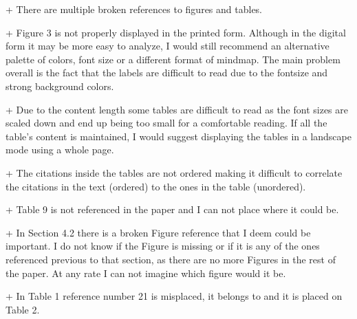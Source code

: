 + There are multiple broken references to figures and tables.


+ Figure 3 is not properly displayed in the printed form. Although in the digital form it may be more easy to analyze, I would still recommend an alternative palette of colors, font size or a different format of mindmap. The main problem overall is the fact that the labels are difficult to read due to the fontsize and strong background colors.






+ Due to the content length some tables are difficult to read as the font sizes are scaled down and end up being too small for a comfortable reading. If all the table's content is maintained, I would suggest displaying the tables in a landscape mode using a whole page.


+ The citations inside the tables are not ordered making it difficult to correlate the citations in the text (ordered) to the ones in the table (unordered).


+ Table 9 is not referenced in the paper and I can not place where it could be.


+ In Section 4.2 there is a broken Figure reference that I deem could be important. I do not know if the Figure is missing or if it is any of the ones referenced previous to that section, as there are no more Figures in the rest of the paper. At any rate I can not imagine which figure would it be.


+ In Table 1 reference number 21 is misplaced, it belongs to and it is
placed on Table 2.



